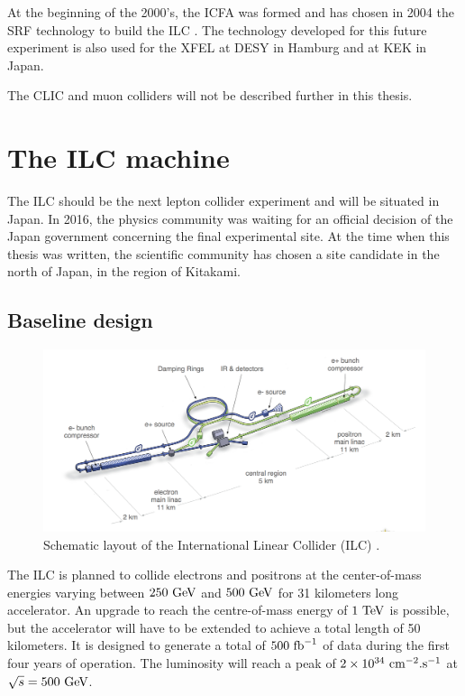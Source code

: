     At the beginning of the 2000's, the \gls{ICFA} was formed and has chosen in 2004 the \gls{SRF} technology \cite{ICFA2004} to build the \gls{ILC} \cite{ILC}.
    The technology developed for this future experiment is also used for the XFEL at \gls{DESY} in Hamburg and at KEK in Japan.
        
    The \gls{CLIC} and muon colliders will not be described further in this thesis.
     
  \section{The ILC machine}
  
    The \gls{ILC} should be the next lepton collider experiment and will be situated in Japan.
    In 2016, the physics community was waiting for an official decision of the Japan government concerning the final experimental site.
    At the time when this thesis was written, the scientific community has chosen a site candidate in the north of Japan, in the region of Kitakami. 
    
    \subsection{Baseline design}

   \begin{figure}[!h]
      \centering
      \includegraphics[width = 16 cm]{Pictures/ILC/ILC_new.png}
      \caption{Schematic layout of the International Linear Collider (ILC) \cite{Behnke2013}.}
      \label{fig:ILC}
    \end{figure}


    The \gls{ILC} is planned to collide electrons and positrons at the center-of-mass energies varying between $250~\rm{GeV}$ and $500~\rm{GeV}$ for 31 kilometers long accelerator. 
    An upgrade to reach the centre-of-mass energy of $1~\rm{TeV}$ is possible, but the accelerator will have to be extended to achieve a total length of 50 kilometers.
    It is designed to generate a total of $500~\rm{fb}^{-1}$ of data during the first four years of operation. 
    The luminosity will reach a peak of $2 \times 10^{34}~\rm{cm}^{-2}\rm{.s}^{-1}$ at $\sqrt s = 500~\rm{GeV}$.

